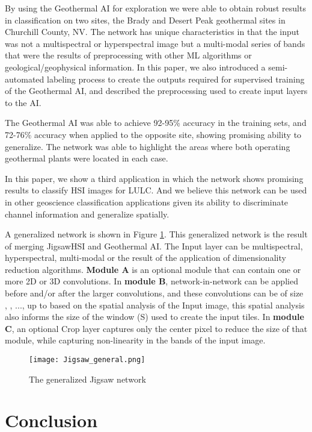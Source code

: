 \documentclass[lettersize, journal]{IEEEtran}
\begin{document}
By using the Geothermal AI for exploration we were able to obtain robust results in classification on two sites, the Brady and Desert Peak geothermal sites in Churchill County, NV. The network has unique characteristics in that the input was not a multispectral or hyperspectral image but a multi-modal series of bands that were the results of preprocessing with other ML algorithms or geological/geophysical information. In this paper, we also introduced a semi-automated labeling process to create the outputs required for supervised training of the Geothermal AI, and described the preprocessing used to create input layers to the AI.

The Geothermal AI was able to achieve 92-95\% accuracy in the training sets, and 72-76\% accuracy when applied to the opposite site, showing promising ability to generalize. The network was able to highlight the areas where both operating geothermal plants were located in each case.

In this paper, we show a third application in which the network shows promising results to classify HSI images for LULC. And we believe this network can be used in other geoscience classification applications given its ability to discriminate channel information and generalize spatially.

A generalized network is shown in Figure \ref{fig:Jigsaw_general}. This generalized network is the result of merging JigsawHSI and Geothermal AI. The Input layer can be multispectral, hyperspectral, multi-modal or the result of the application of dimensionality reduction algorithms. \textbf{Module A} is an optional module that can contain one or more  2D or 3D convolutions. In \textbf{module B}, network-in-network can be applied before and/or after the larger  convolutions, and these convolutions can be of size , , ..., up to  based on the spatial analysis of the Input image, this spatial analysis also informs the size of the window (S) used to create the input tiles.
In \textbf{module C}, an optional Crop layer captures only the center pixel to reduce the size of that module, while capturing non-linearity in the bands of the input image.


\begin{figure}[!htb]
    \centering
    \texttt{[image: Jigsaw\_general.png]}
    \caption{The generalized Jigsaw network}
    \label{fig:Jigsaw_general}
\end{figure}


\section{Conclusion}
\end{document}

